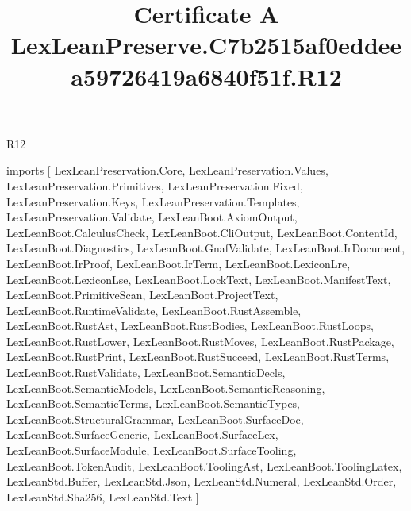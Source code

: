 \begin{lexlean}{R12}
\title{Certificate A LexLeanPreserve.C7b2515af0eddeea59726419a6840f51f.R12}
\begin{coremodule}
imports [
  LexLeanPreservation.Core,
  LexLeanPreservation.Values,
  LexLeanPreservation.Primitives,
  LexLeanPreservation.Fixed,
  LexLeanPreservation.Keys,
  LexLeanPreservation.Templates,
  LexLeanPreservation.Validate,
  LexLeanBoot.AxiomOutput,
  LexLeanBoot.CalculusCheck,
  LexLeanBoot.CliOutput,
  LexLeanBoot.ContentId,
  LexLeanBoot.Diagnostics,
  LexLeanBoot.GnafValidate,
  LexLeanBoot.IrDocument,
  LexLeanBoot.IrProof,
  LexLeanBoot.IrTerm,
  LexLeanBoot.LexiconLre,
  LexLeanBoot.LexiconLse,
  LexLeanBoot.LockText,
  LexLeanBoot.ManifestText,
  LexLeanBoot.PrimitiveScan,
  LexLeanBoot.ProjectText,
  LexLeanBoot.RuntimeValidate,
  LexLeanBoot.RustAssemble,
  LexLeanBoot.RustAst,
  LexLeanBoot.RustBodies,
  LexLeanBoot.RustLoops,
  LexLeanBoot.RustLower,
  LexLeanBoot.RustMoves,
  LexLeanBoot.RustPackage,
  LexLeanBoot.RustPrint,
  LexLeanBoot.RustSucceed,
  LexLeanBoot.RustTerms,
  LexLeanBoot.RustValidate,
  LexLeanBoot.SemanticDecls,
  LexLeanBoot.SemanticModels,
  LexLeanBoot.SemanticReasoning,
  LexLeanBoot.SemanticTerms,
  LexLeanBoot.SemanticTypes,
  LexLeanBoot.StructuralGrammar,
  LexLeanBoot.SurfaceDoc,
  LexLeanBoot.SurfaceGeneric,
  LexLeanBoot.SurfaceLex,
  LexLeanBoot.SurfaceModule,
  LexLeanBoot.SurfaceTooling,
  LexLeanBoot.TokenAudit,
  LexLeanBoot.ToolingAst,
  LexLeanBoot.ToolingLatex,
  LexLeanStd.Buffer,
  LexLeanStd.Json,
  LexLeanStd.Numeral,
  LexLeanStd.Order,
  LexLeanStd.Sha256,
  LexLeanStd.Text
]


\end{coremodule}
\end{lexlean}
